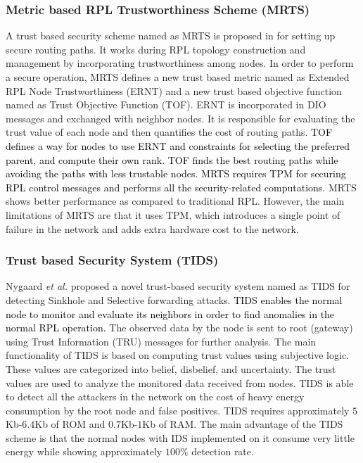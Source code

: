 \documentclass[10pt,journal,sort & compress]{IEEEtran}
\begin{document}
\subsubsection*{Metric based RPL Trustworthiness Scheme (MRTS)}
A trust based security scheme named as MRTS is proposed in \cite{Djedjig2017} for setting up secure routing paths. It works during RPL topology construction and management by incorporating trustworthiness among nodes. In order to perform a secure operation, MRTS defines a new trust based metric named as Extended RPL Node Trustworthiness (ERNT)  and a new trust based objective function named as Trust Objective Function (TOF). ERNT is incorporated in DIO messages and exchanged with neighbor nodes. It is responsible for evaluating the trust value of each node and then quantifies the cost of routing paths. \textcolor{black}{TOF defines a way for nodes to use ERNT and constraints for selecting the preferred parent, and compute their own rank. TOF finds the best routing paths while avoiding the paths with less trustable nodes.} \textcolor{black}{MRTS requires TPM for securing RPL control messages and performs all the security-related computations.} MRTS shows better performance as compared to traditional RPL. However, the main limitations of MRTS are that it uses TPM, which introduces a single point of failure in the network and adds extra hardware cost to the network.


\subsubsection*{Trust based Security System (TIDS)}
Nygaard \textit{et al.} \cite{nygaard2017intrusion} proposed a novel trust-based security system named as TIDS for detecting Sinkhole and Selective forwarding attacks. \textcolor{black}{TIDS enables the normal node to monitor and evaluate its neighbors in order to find anomalies in the normal RPL operation.} The observed data by the node is sent to root (gateway) using Trust Information (TRU) messages for further analysis. The main functionality of TIDS is based on computing trust values using subjective logic. These values are categorized into belief, disbelief, and uncertainty. The trust values are used to analyze the monitored data received from nodes. TIDS is able to detect all the attackers in the network on the cost of heavy energy consumption by the root node and false positives. TIDS requires approximately $ 5 $Kb-$ 6.4 $Kb of ROM and $ 0.7 $Kb-$ 1 $Kb of RAM. The main advantage of the TIDS scheme is that the normal nodes with IDS implemented on it consume very little energy while showing approximately $ 100\% $ detection rate.             
\end{document}
